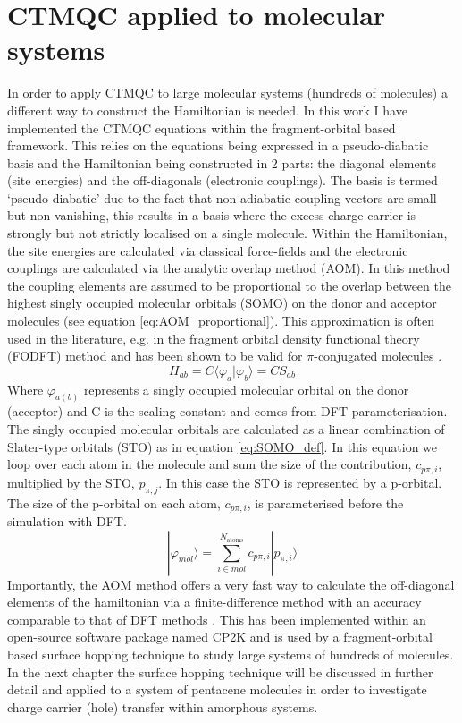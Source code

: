 \chapter{CTMQC applied to molecular systems}
\label{chap:molecular_systems}
In order to apply CTMQC to large molecular systems (hundreds of molecules) a different way to construct the Hamiltonian is needed. In this work I have implemented the CTMQC equations within the fragment-orbital based framework. This relies on the equations being expressed in a pseudo-diabatic basis and the Hamiltonian being constructed in 2 parts: the diagonal elements (site energies) and the off-diagonals (electronic couplings). The basis is termed `pseudo-diabatic' due to the fact that non-adiabatic coupling vectors are small but non vanishing, this results in a basis where the excess charge carrier is strongly but not strictly localised on a single molecule. Within the Hamiltonian, the site energies are calculated via classical force-fields and the electronic couplings are calculated via the analytic overlap method \cite{gajdos_ultrafast_2014, spencer_fob-sh:_2016} (AOM). In this method the coupling elements are assumed to be proportional to the overlap between the highest singly occupied molecular orbitals (SOMO) on the donor and acceptor molecules (see equation \eqref{eq:AOM_proportional}). This approximation is often used in the literature, e.g. in the fragment orbital density functional theory \cite{KirkpatrickJ2008,C2CP41348E,TroisiA2002} (FODFT) method and has been shown to be valid for $\pi$-conjugated molecules \cite{KubasA2014, gajdos_ultrafast_2014}.
\begin{equation}
  H_{ab} = C \langle \varphi_{a} | \varphi_{b} \rangle = C S_{ab}
  \label{eq:AOM_proportional}
\end{equation}
Where $\varphi_{a(b)}$ represents a singly occupied molecular orbital on the donor (acceptor) and C is the scaling constant and comes from DFT parameterisation. The singly occupied molecular orbitals are calculated as a linear combination of Slater-type orbitals (STO) as in equation  \eqref{eq:SOMO_def}. In this equation we loop over each atom in the molecule and sum the size of the contribution, $c_{p\pi, i}$, multiplied by the STO, $p_{\pi, j}$. In this case the STO is represented by a p-orbital. The size of the p-orbital on each atom, $c_{p\pi, i}$, is parameterised before the simulation with DFT.
\begin{equation}
  | \varphi_{mol} \rangle = \sum_{i \in mol}^{N_{\text{atoms}}} c_{p\pi, i} | p_{\pi, i} \rangle
  \label{eq:SOMO_def}
\end{equation}
Importantly, the AOM method offers a very fast way to calculate the off-diagonal elements of the hamiltonian via a finite-difference method with an accuracy comparable to that of DFT methods \cite{AOM_vs_HigherOrder}. This has been implemented within an open-source software package named CP2K and is used by a fragment-orbital based surface hopping technique to study large systems of hundreds of molecules. In the next chapter the surface hopping technique will be discussed in further detail and applied to a system of pentacene molecules in order to investigate charge carrier (hole) transfer within amorphous systems.


